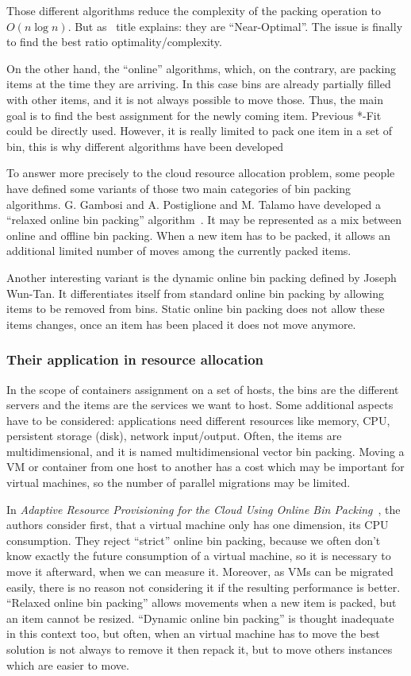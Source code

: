 Those different algorithms reduce the complexity of the packing operation to
$O(n\log{n})$. But as~\cite{mathsBpheuristics} title explains: they are
“Near-Optimal”. The issue is finally to find the best ratio optimality/complexity.

On the other hand, the “online” algorithms, which, on the contrary, are packing
items at the time they are arriving. In this case bins are already partially
filled with other items, and it is not always possible to move those. Thus, the
main goal is to find the best assignment for the newly coming item. Previous
*-Fit could be directly used. However, it is really limited to pack one item in
a set of bin, this is why different algorithms have been developed

To answer more precisely to the cloud resource allocation problem, some people
have defined some variants of those two main categories of bin packing
algorithms. G. Gambosi and A. Postiglione and M. Talamo have developed a
“relaxed online bin packing” algorithm~\cite{mathsRelaxedonlinebp}. It may be
represented as a mix between online and offline bin packing. When a new item has
to be packed, it allows an additional limited number of moves among the
currently packed items.

Another interesting variant is the dynamic online bin packing defined by Joseph
Wun-Tan. It differentiates itself from standard online bin packing by allowing
items to be removed from bins. Static online bin packing does not allow these
items changes, once an item has been placed it does not move anymore.

\subsubsection{Their application in resource allocation}

In the scope of containers assignment on a set of hosts, the bins are the
different servers and the items are the services we want to host. Some
additional aspects have to be considered: applications need different resources
like memory, CPU, persistent storage (disk), network input/output. Often, the
items are multidimensional, and it is named multidimensional vector bin
packing. Moving a VM or container from one host to another has a cost which may
be important for virtual machines, so the number of parallel migrations may be
limited.

In \textit{Adaptive Resource Provisioning for the Cloud Using Online Bin
Packing}~\cite*{reassignmentVisbp}, the authors consider first, that a virtual
machine only has one dimension, its CPU consumption. They reject “strict”
online bin packing, because we often don't know exactly the future consumption
of a virtual machine, so it is necessary to move it afterward, when we can
measure it. Moreover, as VMs can be migrated easily, there is no reason not
considering it if the resulting performance is better. “Relaxed online bin
packing” allows movements when a new item is packed, but an item cannot be
resized. “Dynamic online bin packing” is thought inadequate in this context
too, but often, when an virtual machine has to move the best solution is not
always to remove it then repack it, but to move others instances which are
easier to move.


